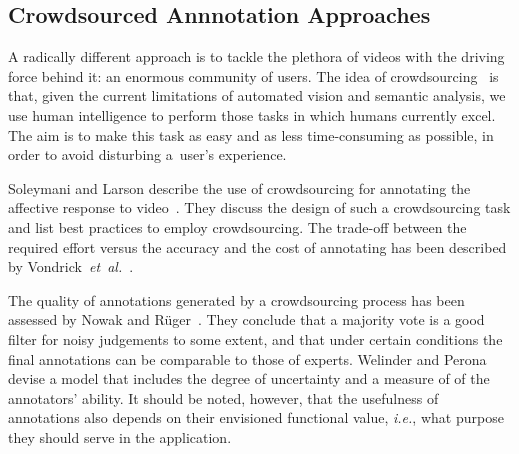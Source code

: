 \documentclass[runningheads,a4paper]{llncs}
\begin{document}
\subsection{Crowdsourced Annnotation Approaches}
A radically different approach is to tackle the plethora of videos with the driving force behind it:
an enormous community of users.
The idea of crowdsourcing~\cite{Doan:2011} is that, given the current limitations of automated vision and semantic analysis, we use human intelligence to perform those tasks in which humans currently excel.
The aim is to make this task as easy and as less time-consuming as possible, in order to avoid disturbing a~user's experience.

Soleymani and Larson describe the use of crowdsourcing for annotating the affective response to video~\cite{Soleymani:2010}.
They discuss the design of such a crowdsourcing task and list best practices to employ crowdsourcing.
The trade-off between the required effort versus the accuracy and the cost of annotating has been described by Vondrick~\emph{et~al.}~\cite{Vondrick:2010}.

The quality of annotations generated by a crowdsourcing process has been assessed by Nowak and R\"{u}ger~\cite{Nowak:2010}.
They conclude that a majority vote is a good filter for noisy judgements to some extent, and that under certain conditions the final annotations can be comparable to those of experts.
Welinder and Perona~\cite{Welinder:2010} devise a model that includes the degree of uncertainty and a measure of of the annotators' ability.
It should be noted, however, that the usefulness of annotations also depends on their envisioned functional value, \emph{i.e.}, what purpose they should serve in the application.
\end{document}
